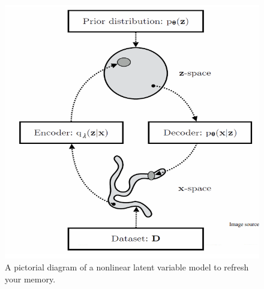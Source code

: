   \begin{figure}[H]
    \centering 
    \includegraphics[scale=0.4]{img/VAE_framework.png}
    \caption{A pictorial diagram of a nonlinear latent variable model to refresh your memory.} 
    \label{fig:vae_framework}
  \end{figure}


